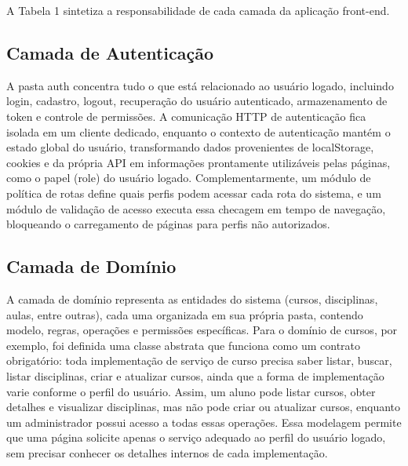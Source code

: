 \documentclass[12pt]{article}
\begin{document}
A Tabela 1 sintetiza a responsabilidade de cada camada da aplicação front-end.

\subsection{Camada de Autenticação}
A pasta auth concentra tudo o que está relacionado ao usuário logado, incluindo login, cadastro, logout, recuperação do usuário autenticado, armazenamento de token e controle de permissões. A comunicação HTTP de autenticação fica isolada em um cliente dedicado, enquanto o contexto de autenticação mantém o estado global do usuário, transformando dados provenientes de localStorage, cookies e da própria API em informações prontamente utilizáveis pelas páginas, como o papel (role) do usuário logado. Complementarmente, um módulo de política de rotas define quais perfis podem acessar cada rota do sistema, e um módulo de validação de acesso executa essa checagem em tempo de navegação, bloqueando o carregamento de páginas para perfis não autorizados.

\subsection{Camada de Domínio}
A camada de domínio representa as entidades do sistema (cursos, disciplinas, aulas, entre outras), cada uma organizada em sua própria pasta, contendo modelo, regras, operações e permissões específicas. Para o domínio de cursos, por exemplo, foi definida uma classe abstrata que funciona como um contrato obrigatório: toda implementação de serviço de curso precisa saber listar, buscar, listar disciplinas, criar e atualizar cursos, ainda que a forma de implementação varie conforme o perfil do usuário. Assim, um aluno pode listar cursos, obter detalhes e visualizar disciplinas, mas não pode criar ou atualizar cursos, enquanto um administrador possui acesso a todas essas operações. Essa modelagem permite que uma página solicite apenas o serviço adequado ao perfil do usuário logado, sem precisar conhecer os detalhes internos de cada implementação.
\end{document}
